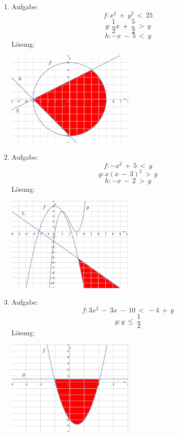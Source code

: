 \begin{enumerate}
	\item Aufgabe: 
					\[f : x^2 \ + \ y^2 \ < \ 25 \]
					\[g : \frac 1 2 x \ + \ \frac 5 2 \ > \ y \]
					\[h : -x \ - \ 5 \ < \ y \]
				L\"osung:
				\begin{center}
						\includegraphics[width=0.5\textwidth]{img/Aufgaben/Graphisch/A1.PNG}
				\end{center}
	\item Aufgabe:
					\[f : - x^2 \ + \ 5 \ < \ y \]
					\[g : x(x \ - \ 3)^2 \ > \ y \]
					\[h : -x \ - \ 2 \ > \ y \]
				L\"osung:
					\begin{center}
						\includegraphics[width=0.5\textwidth]{img/Aufgaben/Graphisch/A2.PNG}
					\end{center}
	\item Aufgabe:
					\[f : 3x^2 \ - \ 3x \ - \ 10 \ < \ -4 \ + \ y \]
					\[g : y \ \leq \ \frac 1 2 \]
				L\"osung:
					\begin{center}
						\includegraphics[width=0.5\textwidth]{img/Aufgaben/Graphisch/A3.PNG}

\end{center}
\end{enumerate}
